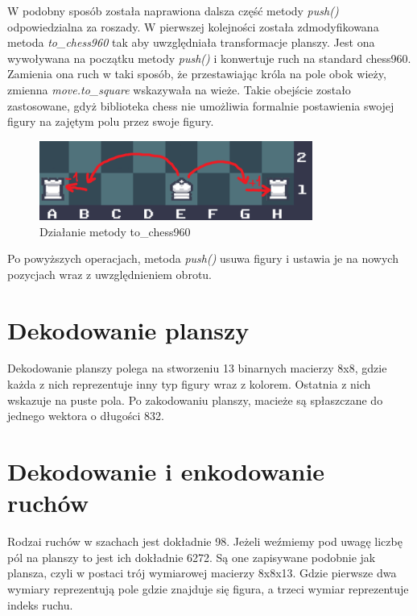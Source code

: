 W podobny sposób została naprawiona dalsza część metody \textit{push()} odpowiedzialna za roszady. W pierwszej kolejności została zdmodyfikowana metoda \textit{to\_chess960} tak aby uwzględniała transformacje planszy. Jest ona wywoływana na początku metody \textit{push()} i konwertuje ruch na standard chess960. Zamienia ona ruch w taki sposób, że przestawiając króla na pole obok wieży, zmienna \textit{move.to\_square} wskazywała na wieże. Takie obejście zostało zastosowane, gdyż biblioteka chess nie umożliwia formalnie postawienia swojej figury na zajętym polu przez swoje figury.

\begin{figure}[!h]
\centering
\includegraphics[width=0.8\textwidth]{images/board with castling.png}
\caption{Działanie metody to\_chess960}
\end{figure}

Po powyższych operacjach, metoda \textit{push()} usuwa figury i ustawia je na nowych pozycjach wraz z uwzględnieniem obrotu.

\section*{Dekodowanie planszy}
Dekodowanie planszy polega na stworzeniu 13 binarnych macierzy 8x8, gdzie każda z nich reprezentuje inny typ figury wraz z kolorem. Ostatnia z nich wskazuje na puste pola. Po zakodowaniu planszy, macieże są spłaszczane do jednego wektora o długości 832. 

\section*{Dekodowanie i enkodowanie ruchów}
Rodzai ruchów w szachach jest dokładnie 98. Jeżeli weźmiemy pod uwagę liczbę pól na planszy to jest ich dokładnie 6272. Są one zapisywane podobnie jak plansza, czyli w postaci trój wymiarowej macierzy 8x8x13. Gdzie pierwsze dwa wymiary reprezentują pole gdzie znajduje się figura, a trzeci wymiar reprezentuje indeks ruchu.

